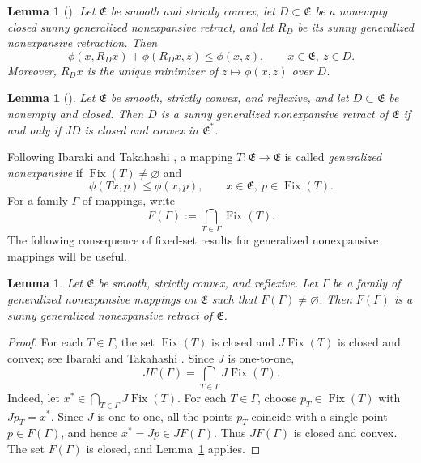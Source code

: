 \documentclass[leqno,12pt]{amsart}
\newtheorem{lemma}[theorem]{Lemma}
\theoremstyle{definition}
\theoremstyle{remark}
\numberwithin{equation}{section}
\newcommand{\E}{\mathfrak{E}}
\newcommand{\Fix}{\operatorname{Fix}}
\begin{document}
\begin{lemma}[\cite{IbarakiTakahashi2010,KohsakaTakahashi2007}]\label{lem:retraction-facts}
Let $\E$ be smooth and strictly convex, let $D\subset\E$ be a nonempty closed sunny generalized nonexpansive retract, and let $R_D$ be its sunny generalized nonexpansive retraction. Then
\begin{equation}\label{eq:retraction-pythagorean}
 \phi(x,R_Dx)+\phi(R_Dx,z)\leq\phi(x,z),
 \qquad x\in\E,\ z\in D.
\end{equation}
Moreover, $R_Dx$ is the unique minimizer of $z\mapsto\phi(x,z)$ over $D$.
\end{lemma}

\begin{lemma}[\cite{KohsakaTakahashi2007}]\label{lem:retract-characterization}
Let $\E$ be smooth, strictly convex, and reflexive, and let $D\subset\E$ be nonempty and closed. Then $D$ is a sunny generalized nonexpansive retract of $\E$ if and only if $JD$ is closed and convex in $\E^*$.
\end{lemma}

Following Ibaraki and Takahashi \cite{IbarakiTakahashi2010}, a mapping $T:\E\to\E$ is called \emph{generalized nonexpansive} if $\Fix(T)\neq\varnothing$ and
\[
 \phi(Tx,p)\leq\phi(x,p),
 \qquad x\in\E,\ p\in\Fix(T).
\]
For a family $\Gamma$ of mappings, write
\[
 F(\Gamma):=\bigcap_{T\in\Gamma}\Fix(T).
\]
The following consequence of fixed-set results for generalized nonexpansive mappings will be useful.

\begin{lemma}\label{lem:common-retract}
Let $\E$ be smooth, strictly convex, and reflexive. Let $\Gamma$ be a family of generalized nonexpansive mappings on $\E$ such that $F(\Gamma)\neq\varnothing$. Then $F(\Gamma)$ is a sunny generalized nonexpansive retract of $\E$.
\end{lemma}

\begin{proof}
For each $T\in\Gamma$, the set $\Fix(T)$ is closed and $J\Fix(T)$ is closed and convex; see Ibaraki and Takahashi \cite{IbarakiTakahashi2010}. Since $J$ is one-to-one,
\[
 JF(\Gamma)=\bigcap_{T\in\Gamma}J\Fix(T).
\]
Indeed, let $x^*\in\bigcap_{T\in\Gamma}J\Fix(T)$. For each $T\in\Gamma$, choose $p_T\in\Fix(T)$ with $Jp_T=x^*$. Since $J$ is one-to-one, all the points $p_T$ coincide with a single point $p\in F(\Gamma)$, and hence $x^*=Jp\in JF(\Gamma)$. Thus $JF(\Gamma)$ is closed and convex. The set $F(\Gamma)$ is closed, and Lemma~\ref{lem:retract-characterization} applies.
\end{proof}
\end{document}
